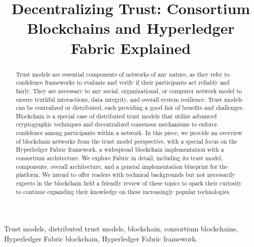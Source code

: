 \documentclass[conference]{IEEEtran}
\begin{document}
\title{Decentralizing Trust: Consortium Blockchains and Hyperledger Fabric Explained}	

\author{
\and
{}
}

\maketitle

\begin{abstract}
Trust models are essential components of networks of any nature, as they refer to confidence frameworks to evaluate and verify if their participants act reliably and fairly. They are necessary to any social, organizational, or computer network model to ensure truthful interactions, data integrity, and overall system resilience. Trust models can be centralized or distributed, each providing a good fair of benefits and challenges. Blockchain is a special case of distributed trust models that utilize advanced cryptographic techniques and decentralized consensus mechanisms to enforce confidence among participants within a network. In this piece, we provide an overview of blockchain networks from the trust model perspective, with a special focus on the Hyperledger Fabric framework, a widespread blockchain implementation with a consortium architecture. We explore Fabric in detail, including its trust model, components, overall architecture, and a general implementation blueprint for the platform. We intend to offer readers with technical backgrounds but not necessarily experts in the blockchain field a friendly review of these topics to spark their curiosity to continue expanding their knowledge on these increasingly popular technologies. 
\end{abstract}

\begin{IEEEkeywords}
Trust models, distributed trust models, blockchain, consortium blockchains, Hyperledger Fabric blockchain, Hyperledger Fabric framework. 
\end{IEEEkeywords}
\end{document}
